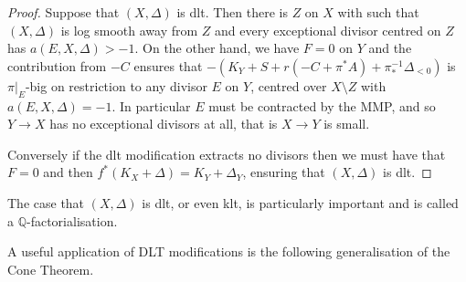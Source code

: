 \documentclass[a4paper,12pt]{book}
\begin{document}
\begin{proof}
 	Suppose that $(X,\Delta)$ is dlt. Then there is $Z$ on $X$ with such that $(X,\Delta)$ is log smooth away from $Z$ and every exceptional divisor centred on $Z$ has $a(E,X,\Delta) > -1$. On the other hand, we have $F=0$ on $Y$ and the contribution from $-C$ ensures that $-(K_{Y}+S+r(-C+\pi^{*}A) + \pi_{*}^{-1}\Delta_{< 0})$ is $\pi|_{E}$-big on restriction to any divisor $E$ on $Y$, centred over $X\setminus Z$ with $a(E,X,\Delta)=-1$. In particular $E$ must be contracted by the MMP, and so $Y \to X$ has no exceptional divisors at all, that is $X \to Y$ is small.
 	
 	Conversely if the dlt modification extracts no divisors then we must have that $F=0$ and then $f^{*}(K_{X}+\Delta)=K_{Y}+\Delta_{Y}$, ensuring that $(X,\Delta)$ is dlt.
	
\end{proof}

The case that $(X,\Delta)$ is dlt, or even klt, is particularly important and is called a $\mathbb{Q}$-factorialisation.

A useful application of DLT modifications is the following generalisation of the Cone Theorem.
\end{document}
